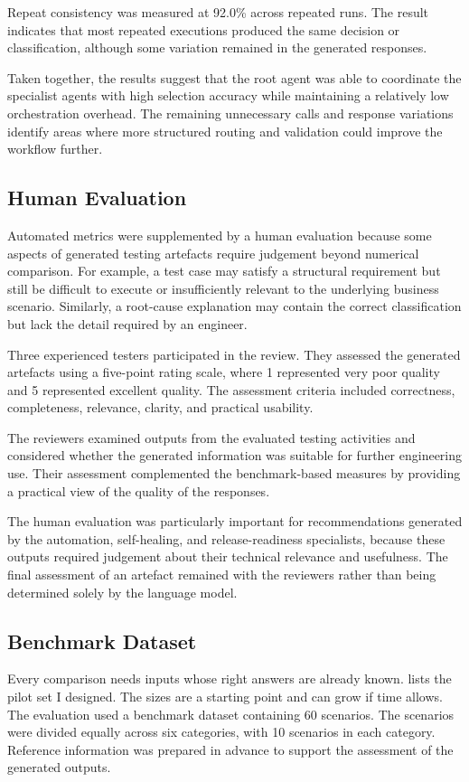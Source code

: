 Repeat consistency was measured at 92.0\% across repeated runs. The result indicates that most repeated executions produced the same decision or classification, although some variation remained in the generated responses.

Taken together, the results suggest that the root agent was able to coordinate the specialist agents with high selection accuracy while maintaining a relatively low orchestration overhead. The remaining unnecessary calls and response variations identify areas where more structured routing and validation could improve the workflow further.


\subsection{Human Evaluation}
Automated metrics were supplemented by a human evaluation because some aspects of generated testing artefacts require judgement beyond numerical comparison. For example, a test case may satisfy a structural requirement but still be difficult to execute or insufficiently relevant to the underlying business scenario. Similarly, a root-cause explanation may contain the correct classification but lack the detail required by an engineer.

Three experienced testers participated in the review. They assessed the generated artefacts using a five-point rating scale, where 1 represented very poor quality and 5 represented excellent quality. The assessment criteria included correctness, completeness, relevance, clarity, and practical usability.

The reviewers examined outputs from the evaluated testing activities and considered whether the generated information was suitable for further engineering use. Their assessment complemented the benchmark-based measures by providing a practical view of the quality of the responses.

The human evaluation was particularly important for recommendations generated by the automation, self-healing, and release-readiness specialists, because these outputs required judgement about their technical relevance and usefulness. The final assessment of an artefact remained with the reviewers rather than being determined solely by the language model.

\subsection{Benchmark Dataset}
Every comparison needs inputs whose right answers are already known.  lists the pilot set I designed. The sizes are a starting point and can grow if time allows.
The evaluation used a benchmark dataset containing 60 scenarios. The scenarios were divided equally across six categories, with 10 scenarios in each category. Reference information was prepared in advance to support the assessment of the generated outputs.

